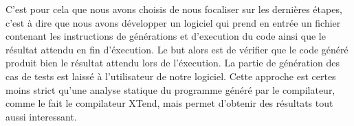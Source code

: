 C'est pour cela que nous avons choisis de nous focaliser sur les dernières étapes, c'est à dire que
nous avons développer un logiciel qui prend en entrée un fichier contenant les instructions de générations et d'execution du code ainsi que le résultat
attendu en fin d'éxecution. Le but alors est de vérifier que le code généré produit bien le résultat attendu lors de l'éxecution. La partie de génération
des cas de tests est laissé à l'utilisateur de notre logiciel. Cette approche est certes moins strict qu'une analyse statique du programme généré par
le compilateur, comme le fait le compilateur XTend, mais permet d'obtenir des résultats tout aussi interessant.


